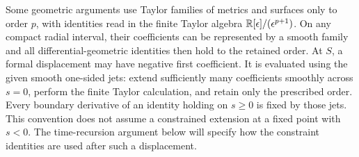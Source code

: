 Some geometric arguments use Taylor families of metrics and
surfaces only to order $p$, with identities read in the finite Taylor
algebra $\mathbb R[\epsilon]/(\epsilon^{p+1})$. On any compact radial interval,
their coefficients can be represented by a smooth family and
all differential-geometric identities then hold to the retained
order. At $S$, a formal displacement may have negative first
coefficient. It is evaluated using the given smooth one-sided
jets: extend sufficiently many coefficients smoothly across
$s=0$, perform the finite Taylor calculation, and retain only
the prescribed order. Every boundary derivative of an identity
holding on $s\geq0$ is fixed by those jets. This convention
does not assume a constrained extension at a fixed point with
$s<0$. The time-recursion argument below will specify how the
constraint identities are used after such a displacement.
